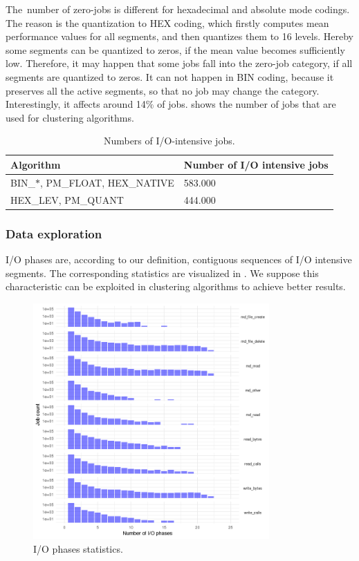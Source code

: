 \documentclass[]{llncs}
\begin{document}
The\ number of zero-jobs is different for hexadecimal and absolute mode codings.
The reason is the quantization to HEX coding, which firstly computes mean performance values for all segments, and then quantizes them to 16 levels.
Hereby some segments can be quantized to zeros, if the mean value becomes sufficiently low.
Therefore, it may happen that some jobs fall into the zero-job category, if all segments are quantized to zeros.
 It can not happen in BIN coding, because it preserves all the active segments, so that no job may change the category.
Interestingly, it affects around 14$\%$  of jobs.
 shows the number of jobs that are used for clustering algorithms.

\begin{table}
  \centering
  \begin{tabular}{ll}
    \hline
    Algorithm & Number of I/O intensive jobs \\
    \hline
    BIN\_$\ast$, PM\_FLOAT, HEX\_NATIVE &  583.000 \\
    \hline
    HEX\_LEV, PM\_QUANT &  444.000 \\
    \hline
  \end{tabular}
  \caption{Numbers of I/O-intensive jobs.}
  \label{tab:n_intensive_jobs}
\end{table}

\subsubsection{Data exploration}
I/O phases are, according to our definition, contiguous sequences of I/O intensive segments.
The corresponding statistics are visualized in .
We suppose this characteristic can be exploited in clustering algorithms to achieve better results.

\begin{figure}
  \centering
  \includegraphics[width=3.55in,height=3.56in]{./media/image23.png}
  \caption{I/O phases statistics.}
  \label{fig:phases_stats}
\end{figure}
\end{document}
